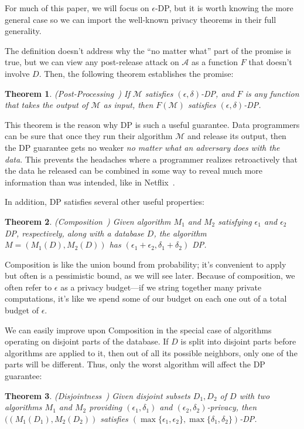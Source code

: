 \documentclass[11pt]{report}
\newtheorem{theorem}{Theorem}
\begin{document}
For much of this paper, we will focus on $\epsilon$-DP, but it is worth knowing the more general case so we can import the well-known privacy theorems in their full generality.

The definition doesn't address why the ``no matter what'' part of the promise is true, but we can view any post-release attack on $\mathcal{A}$ as a function $F$ that doesn't involve $D$. Then, the following theorem establishes the promise:

\begin{theorem}
(Post-Processing~\cite{Dwork:2006}) If $\mathcal{M}$ satisfies $(\epsilon, \delta)$-DP, and $F$ is any function that takes the output of $\mathcal{M}$ as input, then $F(\mathcal{M})$ satisfies $(\epsilon, \delta)$-DP.
\end{theorem}
This theorem is the reason why DP is such a useful guarantee. Data programmers can be sure that once they run their algorithm $\mathcal{M}$ and release its output, then the DP guarantee gets no weaker \emph{no matter what an adversary does with the data}. This prevents the headaches where a programmer realizes retroactively that the data he released can be combined in some way to reveal much more information than was intended, like in Netflix~\cite{Narayanan:2006}.

In addition, DP satisfies several other useful properties:

\begin{theorem} \label{thm:comp}
(Composition~\cite{Dwork:2006}) Given algorithm $M_1$ and $M_2$ satisfying $\epsilon_1$ and $\epsilon_2$ DP, respectively, along with a database $D$, the algorithm $M = (M_1(D), M_2(D))$ has $(\epsilon_1+\epsilon_2, \delta_1+\delta_2)$ DP.
\end{theorem}
Composition is like the union bound from probability; it's convenient to apply but often is a pessimistic bound, as we will see later. Because of composition, we often refer to $\epsilon$ as a privacy budget---if we string together many private computations, it's like we spend some of our budget on each one out of a total budget of $\epsilon$.

We can easily improve upon Composition in the special case of algorithms operating on disjoint parts of the database. If $D$ is split into disjoint parts before algorithms are applied to it, then out of all its possible neighbors, only one of the parts will be different. Thus, only the worst algorithm will affect the DP guarantee:
\begin{theorem}\label{thm:disj}
(Disjointness~\cite{Dwork:2006}) Given disjoint subsets $D_1, D_2$ of $D$ with two algorithms $M_1$ and $M_2$ providing $(\epsilon_1, \delta_1)$ and $(\epsilon_2, \delta_2)$-privacy, then $((M_1(D_1), M_2(D_2))$ satisfies $(\max\{\epsilon_1, \epsilon_2\}, \max\{\delta_1, \delta_2\})$-DP.
\end{theorem}
\end{document}
